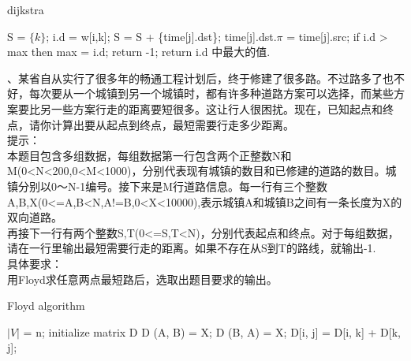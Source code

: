 \documentclass[a4paper, 10pt]{ctexart} %
\begin{document}
\begin{algorithm}
    \caption{dijkstra}
    \begin{algorithmic}[1]
        \State S =  $\{k\}$;
        \State i.d = w[i,k];
        \EndIf
        \EndFor
        \State S = S + \{time[j].dst\}; 
        \State time[j].dst.$\pi$ = time[j].src;
        \EndWhile
        \State if i.d > max then max = i.d;
        \EndFor
        \State return -1;
        \EndIf 
        \State return i.d 中最大的值.
    \end{algorithmic}
\end{algorithm}
\newpage
{}、某省自从实行了很多年的畅通工程计划后，终于修建了很多路。不过路多了也不好，每次要从一个城镇到另一个城镇时，都有许多种道路方案可以选择，而某些方案要比另一些方案行走的距离要短很多。这让行人很困扰。现在，已知起点和终点，请你计算出要从起点到终点，最短需要行走多少距离。\\
提示：\\
本题目包含多组数据，每组数据第一行包含两个正整数N和M(0<N<200,0<M<1000)，分别代表现有城镇的数目和已修建的道路的数目。城镇分别以0～N-1编号。接下来是M行道路信息。每一行有三个整数A,B,X(0<=A,B<N,A!=B,0<X<10000),表示城镇A和城镇B之间有一条长度为X的双向道路。\\
再接下一行有两个整数S,T(0<=S,T<N)，分别代表起点和终点。对于每组数据，请在一行里输出最短需要行走的距离。如果不存在从S到T的路线，就输出-1.\\
具体要求：\\
	用Floyd求任意两点最短路后，选取出题目要求的输出。

\begin{algorithm}
    \caption{Floyd algorithm}
    \begin{algorithmic}[1]
        \State $|V|$ = n;
        \State initialize matrix D 
          
        \State D (A, B)  = X;
        \State D (B, A) = X;
        \EndFor
            \State D[i, j] = D[i, k] + D[k, j];
            \EndIf
        \EndFor
        \EndFor
        \EndFor
    \end{algorithmic}
\end{algorithm}
\end{document}

